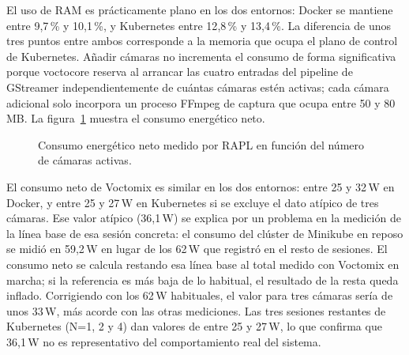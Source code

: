 El uso de RAM es prácticamente plano en los dos entornos: Docker se mantiene
entre 9{,}7\,\% y 10{,}1\,\%, y Kubernetes entre 12{,}8\,\% y 13{,}4\,\%.
La diferencia de unos tres puntos entre ambos corresponde a la memoria que ocupa
el plano de control de Kubernetes. Añadir cámaras no incrementa el consumo de
forma significativa porque voctocore reserva al arrancar las cuatro entradas
del pipeline de GStreamer independientemente de cuántas cámaras estén
activas; cada cámara adicional solo incorpora un proceso FFmpeg de captura que
ocupa entre 50 y 80\,MB.
La figura~\ref{fig:energia_camaras} muestra el consumo energético neto.

\begin{figure}[H]
  \centering
  \caption{Consumo energético neto medido por RAPL en función del número de
           cámaras activas.}
  \label{fig:energia_camaras}
\end{figure}

El consumo neto de Voctomix es similar en los dos entornos: entre 25 y 32\,W
en Docker, y entre 25 y 27\,W en Kubernetes si se excluye el dato atípico de
tres cámaras. Ese valor atípico (36{,}1\,W) se explica por un problema en la
medición de la línea base de esa sesión concreta: el consumo del clúster de
Minikube en reposo se midió en 59{,}2\,W en lugar de los 62\,W que registró
en el resto de sesiones. El consumo neto se calcula restando esa línea base
al total medido con Voctomix en marcha; si la referencia es más baja de lo
habitual, el resultado de la resta queda inflado. Corrigiendo con los 62\,W
habituales, el valor para tres cámaras sería de unos 33\,W, más acorde con las
otras mediciones. Las tres sesiones restantes de Kubernetes (N=1, 2 y 4) dan
valores de entre 25 y 27\,W, lo que confirma que 36{,}1\,W no es representativo
del comportamiento real del sistema.

